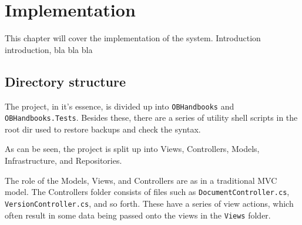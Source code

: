 \chapter{Implementation}
This chapter will cover the implementation of the system. Introduction introduction, bla bla bla
\section{Directory structure}
The project, in it's essence, is divided up into \texttt{OBHandbooks} and \texttt{OBHandbooks.Tests}. Besides these, there are a series of utility shell scripts in the root dir used to restore backups and check the syntax.

As can be seen, the project is split up into Views, Controllers, Models, Infrastructure, and Repositories.

The role of the Models, Views, and Controllers are as in a traditional MVC model. The Controllers folder consists of files such as \texttt{DocumentController.cs}, \texttt{VersionController.cs}, and so forth. These have a series of view actions, which often result in some data being passed onto the views in the \texttt{Views} folder.



